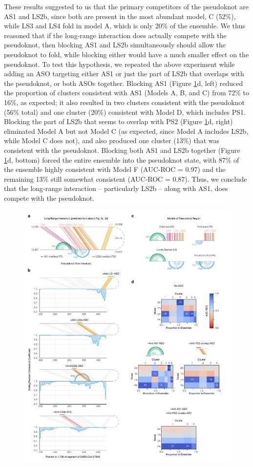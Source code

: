 \documentclass[main.tex]{subfiles}
\begin{document}
These results suggested to us that the primary competitors of the pseudoknot are AS1 and LS2b, since both are present in the most abundant model, C (52\%), while LS3 and LS4 fold in model A, which is only 20\% of the ensemble.
We thus reasoned that if the long-range interaction does actually compete with the pseudoknot, then blocking AS1 and LS2b simultaneously should allow the pseudoknot to fold, while blocking either would have a much smaller effect on the pseudoknot.
To test this hypothesis, we repeated the above experiment while adding an ASO targeting either AS1 or just the part of LS2b that overlaps with the pseudoknot, or both ASOs together.
Blocking AS1 (Figure \ref{lnas}d, left) reduced the proportion of clusters consistent with AS1 (Models A, B, and C) from 72\% to 16\%, as expected; it also resulted in two clusters consistent with the pseudoknot (56\% total) and one cluster (20\%) consistent with Model D, which includes PS1.
Blocking the part of LS2b that seems to overlap with PS2 (Figure \ref{lnas}d, right) eliminated Model A but not Model C (as expected, since Model A includes LS2b, while Model C does not), and also produced one cluster (13\%) that was consistent with the pseudoknot.
Blocking both AS1 and LS2b together (Figure \ref{lnas}d, bottom) forced the entire ensemble into the pseudoknot state, with 87\% of the ensemble highly consistent with Model F (AUC-ROC = 0.97) and the remaining 13\% still somewhat consistent (AUC-ROC = 0.87).
Thus, we conclude that the long-range interaction -- particularly LS2b -- along with AS1, does compete with the pseudoknot.

\begin{figure}[ht]
	\includegraphics[width=\textwidth]{../MainFigures/lnas/lnas.pdf}
	\caption{}
	\label{lnas}
\end{figure}
\end{document}

